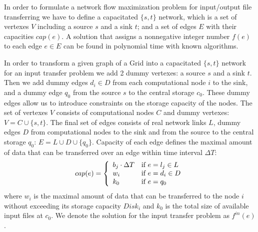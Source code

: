 In order to formulate a network flow maximization problem for input/output file transferring we have to define a capacitated $\{s,t\}$ network, which is a set of vertexes $V$ including a source $s$ and a sink $t$; and a set of edges $E$ with their capacities $cap(e)$. A solution that assigns a nonnegative integer number $f(e)$ to each edge $e \in E$ can be found in polynomial time with known algorithms.

In order to transform a given graph of a Grid into a capacitated $\{s,t\}$ network for an input transfer problem we add 2 dummy vertexes: a source $s$ and a sink $t$. Then we add  dummy edges $d_{i} \in D$ from each computational node $i$ to the sink, and a dummy edge $q_{0}$ from the source $s$ to the central storage $c_{0}$. These dummy edges allow us to introduce constraints on the storage capacity of the nodes. The set of vertexes $V$ consists of computational nodes $C$ and dummy vertexes: $V= C \cup \{s,t\}$. The final set of edges consists of real network links $L$, dummy edges $D$ from computational nodes to the sink and from the source to the central storage $q_{0}$: $E= L \cup D \cup \{q_{0}\}$. Capacity of each edge defines the maximal amount of data that can be transferred over an edge within time interval $\Delta T$: 
\begin{equation}
\label{edge_cap}
cap(e) = \left\{ 
  \begin{array}{l l}
    b_{j} \cdot \Delta T & \text{if }e = l_{j} \in L \\
    w_{i} & \text{if } e = d_{i} \in D\\
    k_{0} & \text{if } e = q_{0}
  \end{array} \right.
\end{equation}
where $w_{i}$ is the maximal amount of data that can be transferred to the node $i$ without exceeding its storage capacity $Disk_{i}$ and $k_{0}$ is the total size of available input files at $c_{0}$. We denote the solution for the input transfer problem as $f^{in}(e)$.

